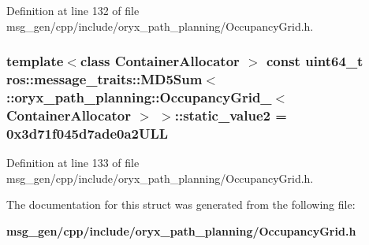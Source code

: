 \-Definition at line 132 of file msg\-\_\-gen/cpp/include/oryx\-\_\-path\-\_\-planning/\-Occupancy\-Grid.\-h.

\subsubsection[{static\-\_\-value2}]{\setlength{\rightskip}{0pt plus 5cm}template$<$class Container\-Allocator $>$ const uint64\-\_\-t ros\-::message\-\_\-traits\-::\-M\-D5\-Sum$<$ \-::{\bf oryx\-\_\-path\-\_\-planning\-::\-Occupancy\-Grid\-\_\-}$<$ \-Container\-Allocator $>$ $>$\-::{\bf static\-\_\-value2} = 0x3d71f045d7ade0a2\-U\-L\-L\hspace{0.3cm}{\ttfamily  [static]}}\label{structros_1_1message__traits_1_1MD5Sum_3_01_1_1oryx__path__planning_1_1OccupancyGrid___3_01ContainerAllocator_01_4_01_4_a6ad6de0cec5d3f1e4192a56eb7c94aa8}


\-Definition at line 133 of file msg\-\_\-gen/cpp/include/oryx\-\_\-path\-\_\-planning/\-Occupancy\-Grid.\-h.



\-The documentation for this struct was generated from the following file\-:\begin{DoxyCompactItemize}
\item 
{\bf msg\-\_\-gen/cpp/include/oryx\-\_\-path\-\_\-planning/\-Occupancy\-Grid.\-h}\end{DoxyCompactItemize}
